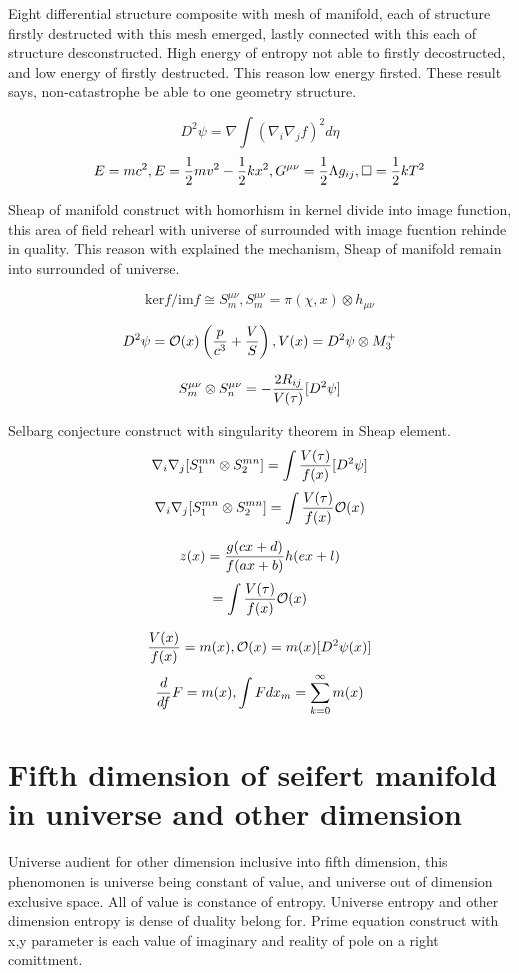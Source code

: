 \documentclass{jsarticle}
\begin{document}
 Eight differential structure composite with mesh of manifold,
each of structure firstly destructed with this mesh emerged,
lastly connected with this each of structure desconstructed.
High energy of entropy not able to firstly decostructed,
and low energy of firstly destructed.
This reason low energy firsted.
These result says, non-catastrophe be able to one geometry structure.

$$ D^2 \psi = \nabla \int (\nabla_{i}\nabla_{j} f)^2 d\eta $$
$$ E = m c^2, E = {1 \over 2}mv^2 - {1 \over 2}kx^2, G^{\mu\nu} = {1 \over 2}\Lambda g_{ij}, 
\square = {1 \over 2}kT^2 $$

  Sheap of manifold construct with homorhism in kernel divide into image function,
this area of field rehearl with universe of surrounded with image fucntion rehinde in quality.
This reason with explained the mechanism, Sheap of manifold remain into surrounded of universe.

$$ \mathrm{ker} f / \mathrm{im} f \cong S^{\mu\nu}_m, S^{\mu\nu}_m = \pi (\chi,x) \otimes h_{\mu\nu} $$

$$ D^2 \psi = \mathcal{O} (x)\left({p \over c^3} + {V \over S}\right), V(x) = D^2\psi \otimes M^{+}_3 $$

$$ S^{\mu\nu}_{m} \otimes S^{\mu\nu}_{n} = - {2R_{ij} \over V(\tau)}[D^2\psi] $$

  Selbarg conjecture construct with singularity theorem in Sheap element.
$$ \nabla_{i}\nabla_{j}[S^{mn}_1 \otimes S^{mn}_2] = \int {V(\tau) \over f(x)}[D^2 \psi] $$
$$  \nabla_{i}\nabla_{j}[S^{mn}_1 \otimes S^{mn}_2] = \int {V(\tau) \over f(x)}\mathcal{O}(x) $$

$$ z(x) = {g(cx + d) \over f(ax + b)}h(ex + l) $$
$$   = \int{V(\tau) \over f(x)}\mathcal{O}(x) $$

$$ {V(x) \over f(x)} = m(x), \mathcal{O}(x) = m(x)[D^2\psi(x)] $$
$$ {d \over df}F = m(x), \int F dx_m = \sum_{k=0}^{\infty} m(x) $$

\section{Fifth dimension of seifert manifold in universe and other dimension}

  Universe audient for other dimension inclusive into fifth dimension, this phenomonen is universe being 
constant of value, and universe out of dimension exclusive space. 
All of value is constance of entropy. Universe entropy and other dimension entropy is dense of duality belong for.
Prime equation construct with x,y parameter is each value of imaginary and reality of pole on a right comittment.
\end{document}
